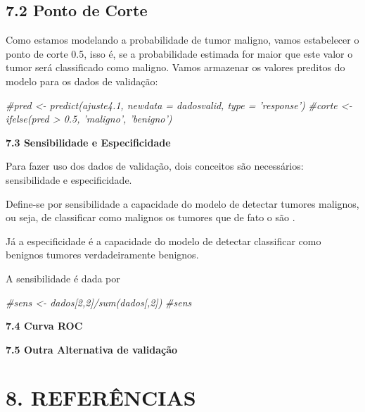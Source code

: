 \documentclass[]{article}
\newenvironment{Shaded}{\begin{snugshade}}{\end{snugshade}}
\newcommand{\CommentTok}[1]{\textcolor[rgb]{0.56,0.35,0.01}{\textit{#1}}}
\begin{document}
\hypertarget{ponto-de-corte}{%
\subsection{\texorpdfstring{\textbf{7.2 Ponto de
Corte}}{7.2 Ponto de Corte}}\label{ponto-de-corte}}

Como estamos modelando a probabilidade de tumor maligno, vamos
estabelecer o ponto de corte 0.5, isso é, se a probabilidade estimada
for maior que este valor o tumor será classificado como maligno. Vamos
armazenar os valores preditos do modelo para os dados de validação:

\begin{Shaded}
\begin{Highlighting}[]
\CommentTok{#pred <- predict(ajuste4.1, newdata = dadosvalid, type = 'response')}
\CommentTok{#corte <- ifelse(pred > 0.5, 'maligno', 'benigno')}
\end{Highlighting}
\end{Shaded}

\textbf{7.3 Sensibilidade e Especificidade}

Para fazer uso dos dados de validação, dois conceitos são necessários:
sensibilidade e especificidade.

Define-se por sensibilidade a capacidade do modelo de detectar tumores
malignos, ou seja, de classificar como malignos os tumores que de fato o
são .

Já a especificidade é a capacidade do modelo de detectar classificar
como benignos tumores verdadeiramente benignos.

A sensibilidade é dada por

\begin{Shaded}
\begin{Highlighting}[]
\CommentTok{#sens <- dados[2,2]/sum(dados[,2])}
\CommentTok{#sens }
\end{Highlighting}
\end{Shaded}

\textbf{7.4 Curva ROC}

\textbf{7.5 Outra Alternativa de validação}

\hypertarget{referencias}{%
\section{8. REFERÊNCIAS}\label{referencias}}
\end{document}
